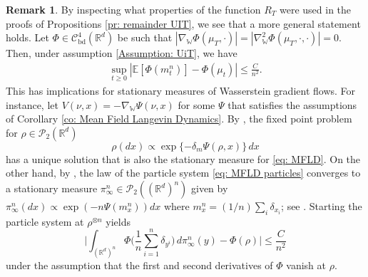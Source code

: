 \documentclass[11pt,reqno]{amsart}
\numberwithin{equation}{section}
\theoremstyle{definition}
\newtheorem{remark}[theorem]{Remark}
\def\E{{\mathbb E}}
\def\R{{\mathbb R}}
\newcommand{\wgrad}{\nabla_{\W}}
\newcommand{\W}{\mathbb W}
\begin{document}
\begin{remark}
\label{rk: long time weak chaos}
By inspecting what properties of the function $R_T$ were used in the proofs of Propositions \ref{pr: remainder UIT}, we see that a more general statement holds.
Let $\Phi \in \mathcal C_{\text{bd}}^4(\R^d)$ be such that $|\wgrad \Phi(\mu_T,\cdot)|=|\wgrad^2 \Phi(\mu_T,\cdot,\cdot)|=0$. Then, under assumption \ref{Assumption: UiT}, we have
    \begin{align*}
        \sup_{t\geq 0}|\E[\Phi(m_t^n)]-\Phi(\mu_t)|\leq \frac C{n^2}.
    \end{align*}
    This has implications for stationary measures of Wasserstein gradient flows. For instance, let $V(\nu,x)=-\wgrad \Psi(\nu,x)$ for some $\Psi$ that satisfies the assumptions of Corollary \ref{co: Mean Field Langevin Dynamics}. By \cite[Proposition 4.4]{ChaosMFLD}, the fixed point problem for $\rho \in \mathcal P_2(\R^d)$
    \[\rho(dx)\propto \exp\{-\delta_m \Psi(\rho,x)\}\,dx\]
    has a unique solution that is also the stationary measure for \eqref{eq: MFLD}. On the other hand, by \cite[Proposition 4.3]{ChaosMFLD}, the law of the particle system \eqref{eq: MFLD particles} converges to a stationary measure $\pi_\infty^n\in \mathcal P_2((\R^d)^n)$ given by $\pi^n_\infty(dx) \propto \exp(-n\Psi(m^n_x))dx$ where $m^n_x = (1/n)\sum_i\delta_{x_i}$; see \cite[Equation (2.16)]{ChaosMFLD}. Starting the particle system at $\rho^{\otimes n}$ yields 
    \[\Big|\int_{(\R^d)^n} \Phi\Big(\frac 1n \sum_{i=1}^n \delta_{y^i}\Big)\,d\pi^n_\infty(y) -\Phi(\rho) \Big|\leq \frac{C}{n^2}\]
    under the assumption that the first and second derivatives of $\Phi$ vanish at $\rho$.
\end{remark}
\end{document}
